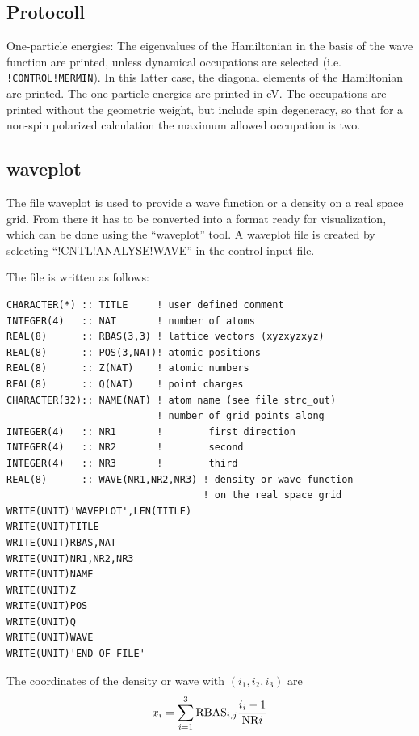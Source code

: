 \documentclass[final,12pt]{article}
\begin{document}
{{{{{{\subsection{Protocoll}
One-particle energies: The eigenvalues of the Hamiltonian in the basis
of the wave function are printed, unless dynamical occupations are
selected (i.e. \texttt{!CONTROL!MERMIN}). In this latter case, the
diagonal elements of the Hamiltonian are printed. The one-particle
energies are printed in eV. The occupations are printed without the
geometric weight, but include spin degeneracy, so that for a non-spin
polarized calculation the maximum allowed occupation is two.



\subsection{waveplot}
The file waveplot is used to provide a wave function or a density on
a real space grid. From there it has to be converted into a format
ready for visualization, which can be done using the ``waveplot'' tool.
A waveplot file is created by selecting ``!CNTL!ANALYSE!WAVE'' in the
control input file.


The file is written as follows:
\small{
\begin{verbatim}
CHARACTER(*) :: TITLE     ! user defined comment
INTEGER(4)   :: NAT       ! number of atoms
REAL(8)      :: RBAS(3,3) ! lattice vectors (xyzxyzxyz)
REAL(8)      :: POS(3,NAT)! atomic positions
REAL(8)      :: Z(NAT)    ! atomic numbers 
REAL(8)      :: Q(NAT)    ! point charges
CHARACTER(32):: NAME(NAT) ! atom name (see file strc_out)
                          ! number of grid points along 
INTEGER(4)   :: NR1       !        first direction
INTEGER(4)   :: NR2       !        second
INTEGER(4)   :: NR3       !        third
REAL(8)      :: WAVE(NR1,NR2,NR3) ! density or wave function 
                                  ! on the real space grid
WRITE(UNIT)'WAVEPLOT',LEN(TITLE)
WRITE(UNIT)TITLE
WRITE(UNIT)RBAS,NAT
WRITE(UNIT)NR1,NR2,NR3
WRITE(UNIT)NAME
WRITE(UNIT)Z
WRITE(UNIT)POS
WRITE(UNIT)Q
WRITE(UNIT)WAVE
WRITE(UNIT)'END OF FILE'
\end{verbatim}
}

The coordinates of the density or wave with $(i_1,i_2,i_3)$ are 
\begin{equation}
  x_i=\sum_{i=1}^{3} {\rm RBAS}_{i,j}{{i_i-1}\over{{\rm NR}i}} 
\end{equation}

}}}}}}
\end{document}
